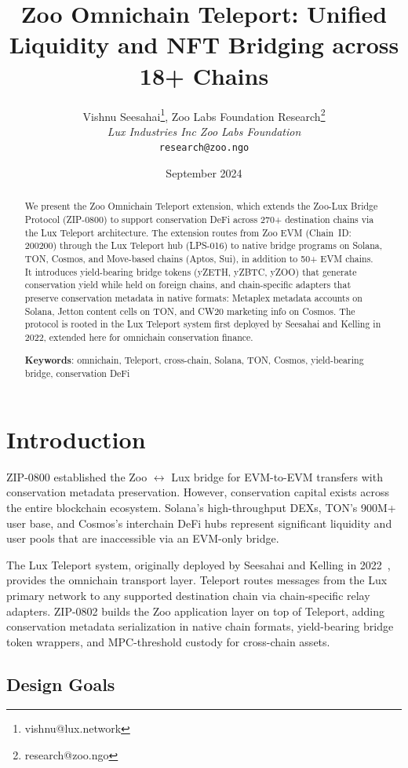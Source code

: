 \documentclass[11pt,letterpaper]{article}
\title{\textbf{Zoo Omnichain Teleport: Unified Liquidity and NFT Bridging across 18+ Chains}}
\author{
Vishnu Seesahai\thanks{vishnu@lux.network}, Zoo Labs Foundation Research\thanks{research@zoo.ngo}\\
\textit{Lux Industries Inc \quad Zoo Labs Foundation}\\
\texttt{research@zoo.ngo}
}
\date{September 2024}
\begin{document}
\zoocoverpage

\begin{abstract}
We present the Zoo Omnichain Teleport extension, which extends the Zoo-Lux Bridge Protocol (ZIP-0800) to support conservation DeFi across 270+ destination chains via the Lux Teleport architecture. The extension routes from Zoo EVM (Chain~ID: 200200) through the Lux Teleport hub (LPS-016) to native bridge programs on Solana, TON, Cosmos, and Move-based chains (Aptos, Sui), in addition to 50+ EVM chains. It introduces yield-bearing bridge tokens (yZETH, yZBTC, yZOO) that generate conservation yield while held on foreign chains, and chain-specific adapters that preserve conservation metadata in native formats: Metaplex metadata accounts on Solana, Jetton content cells on TON, and CW20 marketing info on Cosmos. The protocol is rooted in the Lux Teleport system first deployed by Seesahai and Kelling in 2022, extended here for omnichain conservation finance.

\textbf{Keywords}: omnichain, Teleport, cross-chain, Solana, TON, Cosmos, yield-bearing bridge, conservation DeFi
\end{abstract}

\section{Introduction}

ZIP-0800 established the Zoo $\leftrightarrow$ Lux bridge for EVM-to-EVM transfers with conservation metadata preservation. However, conservation capital exists across the entire blockchain ecosystem. Solana's high-throughput DEXs, TON's 900M+ user base, and Cosmos's interchain DeFi hubs represent significant liquidity and user pools that are inaccessible via an EVM-only bridge.

The Lux Teleport system, originally deployed by Seesahai and Kelling in 2022~\cite{teleport2022}, provides the omnichain transport layer. Teleport routes messages from the Lux primary network to any supported destination chain via chain-specific relay adapters. ZIP-0802 builds the Zoo application layer on top of Teleport, adding conservation metadata serialization in native chain formats, yield-bearing bridge token wrappers, and MPC-threshold custody for cross-chain assets.

\subsection{Design Goals}
\end{document}
